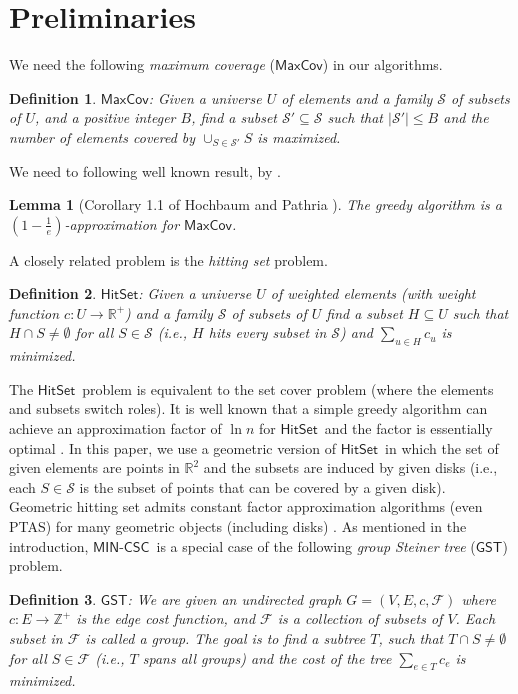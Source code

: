 \documentclass[11pt]{article}
\newcommand{\calF}{{\mathcal F}}
\newcommand{\calS}{{\mathcal S}}
\newcommand{\Z}{\mathbb{Z}}
\newcommand{\R}{\mathbb{R}}
\newcommand{\mincsc}{$\mathsf{MIN}$-$\mathsf{CSC}$}
\newcommand{\bsc}{$\mathsf{MaxCov}$}
\newcommand{\gst}{$\mathsf{GST}$}
\newcommand{\hittingset}{$\mathsf{HitSet}$}
\newtheorem{lemma}{Lemma}
\newtheorem{definition}{Definition}
\begin{document}
\section{Preliminaries}
\label{sec:prel}

We need the following \emph{maximum coverage} (\bsc) in our algorithms.
\begin{definition}
	\bsc: Given a universe $U$ of elements and a family $\calS$ of subsets of $U$, and a positive integer $B$,
	find a subset $\calS'\subseteq \calS$
	such that $|\calS'| \leq B$ and the number of elements covered by
	$\cup_{S\in\calS'}S$ is maximized.
\end{definition}
We need to following well known result, by \cite{nemhauser1978analysis,hochbaum1998analysis}.
\begin{lemma}[Corollary 1.1 of  Hochbaum and Pathria \cite{hochbaum1998analysis}]
	The greedy algorithm is a $(1-\frac{1}{e})$-approximation for \bsc .
	\label{lm_bsc}
\end{lemma}

A closely related problem is the {\em hitting set} problem.
\begin{definition}
	\hittingset: Given a universe $U$ of weighted elements (with weight function $c:U\rightarrow\R^+$)
	and a family $\calS$ of subsets of $U$
	find a subset $H\subseteq U$
	such that $H\cap S \neq \emptyset$ for all $S\in \calS$ (i.e., $H$ hits every subset in $\calS$) and
	$\sum_{u\in H}c_u$ is minimized.
\end{definition}

The \hittingset\ problem is equivalent to the set cover problem (where the elements and subsets switch roles).
It is well known that a simple greedy algorithm
can achieve an approximation factor of $\ln n$ for \hittingset\
and the factor is essentially optimal \cite{feige1998threshold,dinur2014analytical}.
In this paper, we use a geometric version of \hittingset\ in which
the set of given elements are points in $\R^2$ and the subsets are
induced by given disks (i.e., each $S\in\calS$ is the subset of points that can be covered by
a given disk). Geometric hitting set admits constant factor approximation algorithms (even PTAS)
for many geometric objects (including disks) \cite{bronnimann1995almost,Clarkson,mustafa2009ptas,varadarajan2010weighted,Chan2012}.
As mentioned in the introduction, \mincsc\ is a special case of
the following {\em group Steiner tree} (\gst) problem.

\begin{definition}
	\gst: We are given an undirected graph $G=(V,E,c,\calF)$
	where $c: E\rightarrow \Z^+$ is the edge cost function,
	and $\calF$ is a collection of subsets of $V$.
	Each subset in $\calF$ is called a group.
The goal is to find a subtree $T$, such that
	$T\cap S\ne \emptyset$ for all $S\in \calF$ (i.e., $T$ spans all groups)
	and the cost of the tree $\sum_{e\in T}c_e$ is minimized.
\end{definition}
\end{document}
